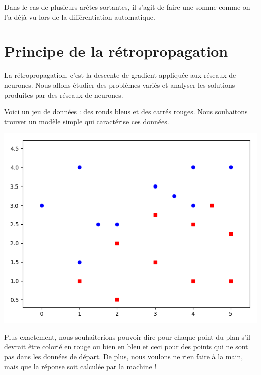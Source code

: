 Dans le cas de plusieurs arêtes sortantes, il s'agit de faire une somme comme on l'a déjà vu lors de la différentiation automatique.





\section{Principe de la rétropropagation}

La rétropropagation, c'est la descente de gradient appliquée aux réseaux de neurones. Nous allons étudier des problèmes variés et analyser les solutions produites par des réseaux de neurones.
	
Voici un jeu de données : des ronds bleus et des carrés rouges.
Nous souhaitons trouver un modèle simple qui caractérise ces données.


\begin{center}
	\includegraphics[scale=\myscale,scale=0.5]{figures/retro_01_a}
\end{center}

Plus exactement, nous souhaiterions pouvoir dire pour chaque point du plan s'il devrait être colorié en rouge ou bien en bleu et ceci pour des points qui ne sont pas dans les données de départ. De plus, nous voulons ne rien faire à la main, mais que la réponse soit calculée par la machine !


